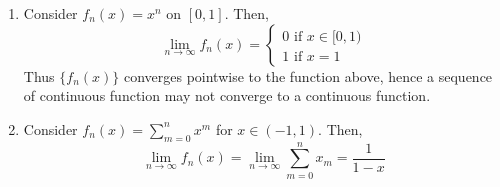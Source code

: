 \begin{enumerate}
    \item Consider $f_n(x) = x^n$ on $[0,1]$. Then,
        \begin{equation*}
            \lim \limits_{n \to \infty} f_n(x) = \begin{cases}
                0 \text{ if } x \in [0,1) \\
                1 \text{ if } x=1
            \end{cases}
        \end{equation*}
        Thus $\{f_n(x)\}$ converges pointwise to the function above, hence a sequence of continuous function may not converge to a continuous function.
    \item Consider $f_n(x) = \sum_{m=0}^n x^m$ for $x \in (-1,1)$. Then,
        \begin{equation*}
            \lim \limits_{n \to \infty} f_n(x) = \lim \limits_{n \to \infty} \sum \limits_{m=0}^n x_m = \frac{1}{1-x}
        \end{equation*}
\end{enumerate}